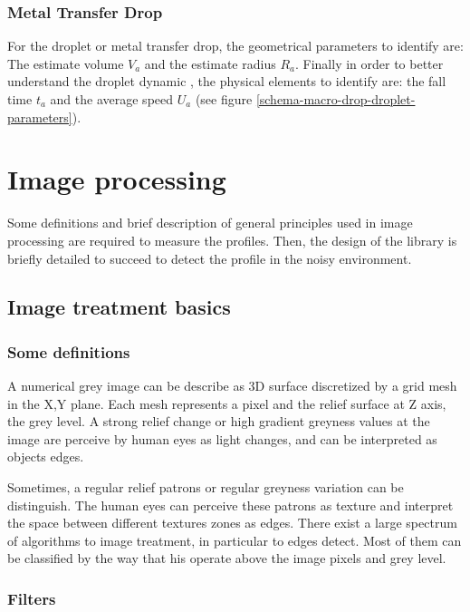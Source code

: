 \documentclass[12pt]{iopart}
\begin{document}
\subsubsection{ Metal Transfer Drop}
\label{ metam_transfer_drop}

For the droplet or metal transfer drop, the geometrical parameters to identify are:
The estimate volume $V_{a}$ and the estimate radius $R_{a}$. 
Finally in order to better understand the droplet dynamic \cite{}, 
the physical elements to identify are: the fall time $t_{a}$ and the average 
speed $U_{a}$ (see figure \ref{schema-macro-drop-droplet-parameters}).



\section{Image processing} 

Some definitions and brief description of general principles used in
 image processing are required to measure the profiles. Then, the design of the library is briefly detailed
to succeed to detect the profile in the noisy environment.
\subsection{Image treatment basics}
\subsubsection{Some definitions}\label{some_definitions}
A numerical grey image can be describe as 3D surface discretized by a grid mesh
 in the X,Y plane. Each mesh represents a pixel and the relief surface at Z axis,
 the grey level. 
A strong relief change or high gradient greyness values at
 the image are perceive by human eyes as light changes, and can be interpreted
 as objects edges. 

Sometimes, a regular relief patrons or regular greyness
 variation can be distinguish. The human eyes can perceive these patrons as texture 
and interpret the space between different textures zones as edges.
There exist a large spectrum of algorithms to image treatment, in particular to edges detect.
 Most of them can be classified by the way that his operate above the image pixels and grey level.

\subsubsection{Filters}\label{filters}
\end{document}
